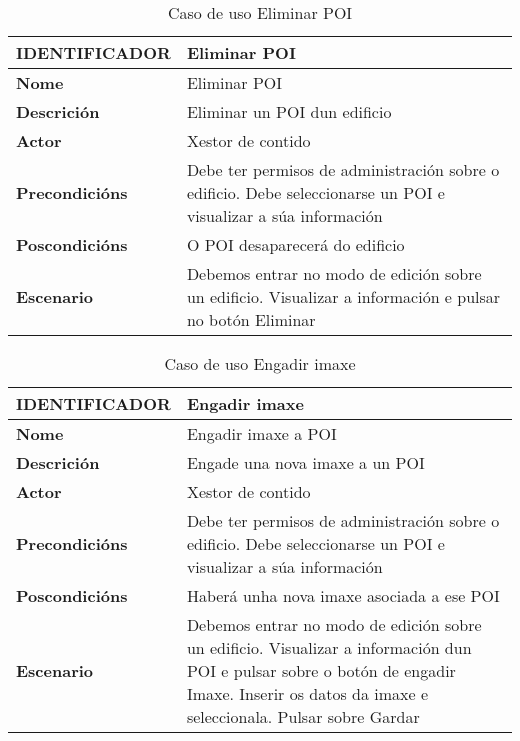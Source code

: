 \begin{table}[tbp]
	\begin{tabular}{|l|p{10cm}|}
		\hline 
		\textbf{IDENTIFICADOR}	& \textbf{Eliminar POI} \\ 
		\hline 
		\textbf{Nome} & Eliminar POI \\ 
		\hline 
		\textbf{Descrición} & Eliminar un POI dun edificio \\ 
		\hline 
		\textbf{Actor} & Xestor de contido \\ 
		\hline 
		\textbf{Precondicións} & Debe ter permisos de administración sobre o edificio. Debe seleccionarse un POI e visualizar a súa información \\ 
		\hline 
		\textbf{Poscondicións} & O POI desaparecerá do edificio \\ 
		\hline 
		\textbf{Escenario} & Debemos entrar no modo de edición sobre un edificio. Visualizar a información e pulsar no botón Eliminar \\ 
		\hline 
	\end{tabular}
	\caption{Caso de uso Eliminar POI}
	\label{tab:cuEliminarPOI}
\end{table}

\begin{table}[tbp]
	\begin{tabular}{|l|p{10cm}|}
		\hline 
		\textbf{IDENTIFICADOR}	& \textbf{Engadir imaxe} \\ 
		\hline 
		\textbf{Nome} & Engadir imaxe a POI \\ 
		\hline 
		\textbf{Descrición} & Engade una nova imaxe a un POI \\ 
		\hline 
		\textbf{Actor} & Xestor de contido \\ 
		\hline 
		\textbf{Precondicións} & Debe ter permisos de administración sobre o edificio. Debe seleccionarse un POI e visualizar a súa información \\ 
		\hline 
		\textbf{Poscondicións} & Haberá unha nova imaxe asociada a ese POI \\ 
		\hline 
		\textbf{Escenario} & Debemos entrar no modo de edición sobre un edificio. Visualizar a información dun POI e pulsar sobre o botón de engadir Imaxe. Inserir os datos da imaxe e seleccionala. Pulsar sobre Gardar \\ 
		\hline 
	\end{tabular}
	\caption{Caso de uso Engadir imaxe}
	\label{tab:cuEngadirImaxe}
\end{table}

